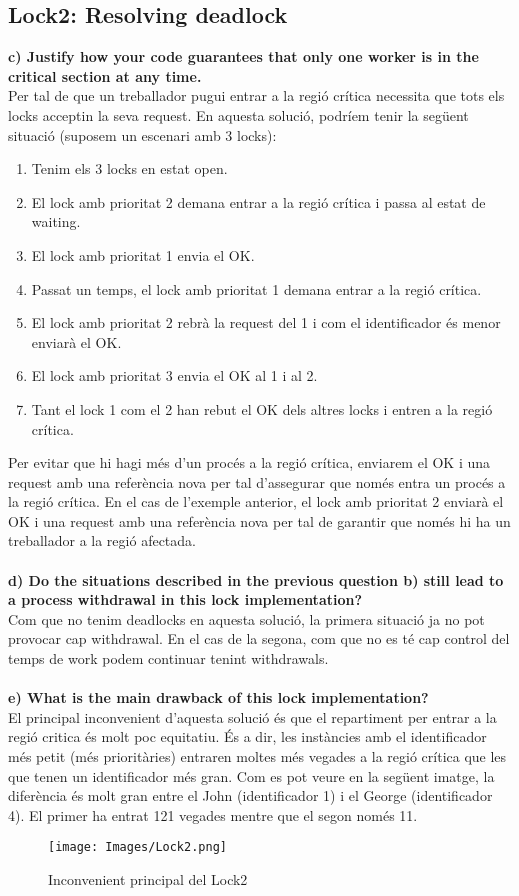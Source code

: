 \documentclass[a4paper, 10pt]{article}
\begin{document}
\subsection{\textbf{Lock2: Resolving deadlock}}
\textbf{c) Justify how your code guarantees that only one worker is in the critical section at any time.\\}
Per tal de que un treballador pugui entrar a la regió crítica necessita que tots els locks acceptin la seva request. En aquesta solució, podríem tenir la següent situació (suposem un escenari amb 3 locks):
\begin{enumerate}
\item Tenim els 3 locks en estat open.
\item El lock amb prioritat 2 demana entrar a la regió crítica i passa al estat de waiting.
\item El lock amb prioritat 1 envia el OK.
\item Passat un temps, el lock amb prioritat 1 demana entrar a la regió crítica. 
\item El lock amb prioritat 2 rebrà la request del 1 i com el identificador és menor enviarà el OK. 
\item El lock amb prioritat 3 envia el OK al 1 i al 2.
\item Tant el lock 1 com el 2 han rebut el OK dels altres locks i entren a la regió crítica. 
\end{enumerate}
Per evitar que hi hagi més d’un procés a la regió crítica, enviarem el OK i una request amb una referència nova per tal d’assegurar que només entra un procés a la regió crítica. En el cas de l’exemple anterior, el lock amb prioritat 2 enviarà el OK i una request amb una referència nova per tal de garantir que només hi ha un treballador a la regió afectada.\\\\ 
\textbf{d) Do the situations described in the previous question b) still lead to a process withdrawal in this lock implementation?\\}
Com que no tenim deadlocks en aquesta solució, la primera situació ja no pot provocar cap withdrawal. En el cas de la segona, com que no es té cap control del temps de work podem continuar tenint withdrawals.\\\\ 
\textbf{e) What is the main drawback of this lock implementation?\\}
El principal inconvenient d’aquesta solució és que el repartiment per entrar a la regió critica és molt poc equitatiu. És a dir, les instàncies amb el identificador més petit (més prioritàries) entraren moltes més vegades a la regió crítica que les que tenen un identificador més gran. Com es pot veure en la següent imatge, la diferència és molt gran entre el John (identificador 1) i el George (identificador 4). El primer ha entrat 121 vegades mentre que el segon només 11.
\begin{figure}[H]
    \centering
    \texttt{[image: Images/Lock2.png]}
    \caption{Inconvenient principal del Lock2}
    \label{fig:privLevel}
\end{figure}
\end{document}
